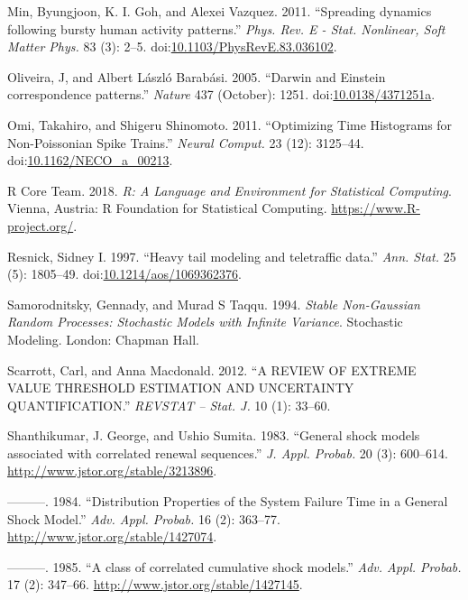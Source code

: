 \documentclass[smallextended]{svjour3}       %
\begin{document}
\hypertarget{ref-Min2010}{}
Min, Byungjoon, K. I. Goh, and Alexei Vazquez. 2011. ``Spreading
dynamics following bursty human activity patterns.'' \emph{Phys. Rev. E
- Stat. Nonlinear, Soft Matter Phys.} 83 (3): 2--5.
doi:\href{https://doi.org/10.1103/PhysRevE.83.036102}{10.1103/PhysRevE.83.036102}.

\hypertarget{ref-Oliveira2005}{}
Oliveira, J, and Albert László Barabási. 2005. ``Darwin and Einstein
correspondence patterns.'' \emph{Nature} 437 (October): 1251.
doi:\href{https://doi.org/10.0138/4371251a}{10.0138/4371251a}.

\hypertarget{ref-Omi2011}{}
Omi, Takahiro, and Shigeru Shinomoto. 2011. ``Optimizing Time Histograms
for Non-Poissonian Spike Trains.'' \emph{Neural Comput.} 23 (12):
3125--44.
doi:\href{https://doi.org/10.1162/NECO_a_00213}{10.1162/NECO\_a\_00213}.

\hypertarget{ref-R}{}
R Core Team. 2018. \emph{R: A Language and Environment for Statistical
Computing}. Vienna, Austria: R Foundation for Statistical Computing.
\url{https://www.R-project.org/}.

\hypertarget{ref-Resnick97}{}
Resnick, Sidney I. 1997. ``Heavy tail modeling and teletraffic data.''
\emph{Ann. Stat.} 25 (5): 1805--49.
doi:\href{https://doi.org/10.1214/aos/1069362376}{10.1214/aos/1069362376}.

\hypertarget{ref-SamorodnitskyTaqqu}{}
Samorodnitsky, Gennady, and Murad S Taqqu. 1994. \emph{Stable
Non-Gaussian Random Processes: Stochastic Models with Infinite
Variance}. Stochastic Modeling. London: Chapman Hall.

\hypertarget{ref-Scarrott12}{}
Scarrott, Carl, and Anna Macdonald. 2012. ``A REVIEW OF EXTREME VALUE
THRESHOLD ESTIMATION AND UNCERTAINTY QUANTIFICATION.'' \emph{REVSTAT --
Stat. J.} 10 (1): 33--60.

\hypertarget{ref-Sumita1983}{}
Shanthikumar, J. George, and Ushio Sumita. 1983. ``General shock models
associated with correlated renewal sequences.'' \emph{J. Appl. Probab.}
20 (3): 600--614. \url{http://www.jstor.org/stable/3213896}.

\hypertarget{ref-Sumita1984}{}
---------. 1984. ``Distribution Properties of the System Failure Time in
a General Shock Model.'' \emph{Adv. Appl. Probab.} 16 (2): 363--77.
\url{http://www.jstor.org/stable/1427074}.

\hypertarget{ref-Sumita1985}{}
---------. 1985. ``A class of correlated cumulative shock models.''
\emph{Adv. Appl. Probab.} 17 (2): 347--66.
\url{http://www.jstor.org/stable/1427145}.
\end{document}

